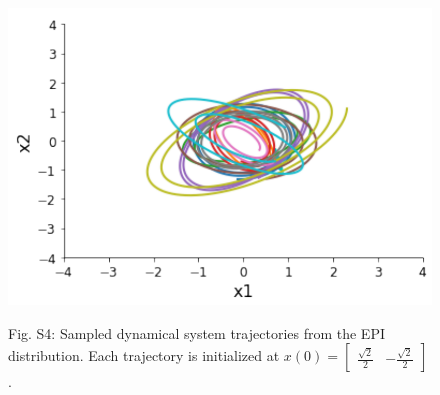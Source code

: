 \documentclass[11pt]{article}
\begin{document}
\begin{figure}
\begin{center}
\includegraphics[scale=0.5]{figures/figS4/figS4.pdf}
\end{center}
\begin{flushleft}
Fig. S4: Sampled dynamical system trajectories from the EPI distribution.  Each trajectory is initialized at $x(0) = \begin{bmatrix} \frac{\sqrt{2}}{2} & -\frac{\sqrt{2}}{2} \end{bmatrix}$.
\end{flushleft}
\end{figure}
\end{document}
